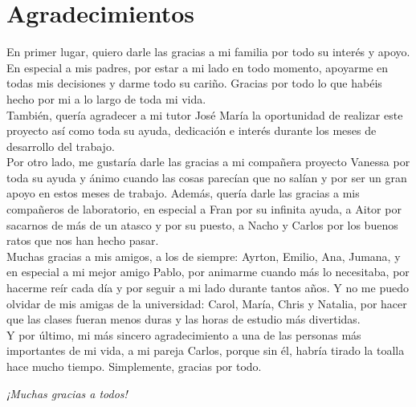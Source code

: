 \chapter*{Agradecimientos}
En primer lugar, quiero darle las gracias a mi familia por todo su interés y apoyo. En especial a mis padres, por estar a mi lado en todo momento, apoyarme en todas mis decisiones y darme todo su cariño. Gracias por todo lo que habéis hecho por mi a lo largo de toda mi vida.\\

También, quería agradecer a mi tutor José María la oportunidad de realizar este proyecto así como toda su ayuda, dedicación e interés durante los meses de desarrollo del trabajo.\\

Por otro lado, me gustaría darle las gracias a mi compañera proyecto Vanessa por toda su ayuda y ánimo cuando las cosas parecían que no salían y por ser un gran apoyo en estos meses de trabajo. Además, quería darle las gracias a mis compañeros de laboratorio, en especial a Fran por su infinita ayuda, a Aitor por sacarnos de más de un atasco y por su puesto, a Nacho y Carlos por los buenos ratos que nos han hecho pasar.\\

Muchas gracias a mis amigos, a los de siempre: Ayrton, Emilio, Ana, Jumana, y en especial a mi mejor amigo Pablo, por animarme cuando más lo necesitaba, por hacerme reír cada día y por seguir a mi lado durante tantos años. Y no me puedo olvidar de mis amigas de la universidad: Carol, María, Chris y Natalia, por hacer que las clases fueran menos duras y las horas de estudio más divertidas.\\

Y por último, mi más sincero agradecimiento a una de las personas más importantes de mi vida, a mi pareja Carlos, porque sin él, habría tirado la toalla hace mucho tiempo. Simplemente, gracias por todo.

\begin{flushright}
	\emph{¡Muchas gracias a todos!}
\end{flushright}